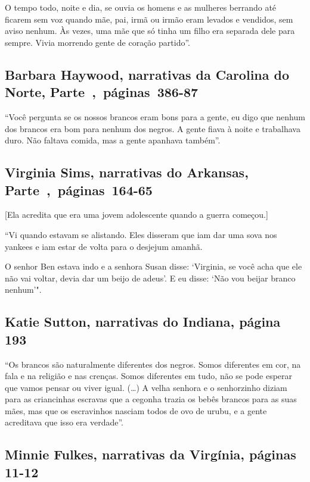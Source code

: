 O tempo todo, noite e dia, se ouvia os homens e as mulheres berrando até
ficarem sem voz quando mãe, pai, irmã ou irmão eram levados e vendidos,
sem aviso nenhum. Às vezes, uma mãe que só tinha um filho era separada
dele para sempre. Vivia morrendo gente de coração partido''.

\subsection{Barbara Haywood, narrativas da Carolina do Norte, Parte~,~páginas~386-87}
\label{ref132}

``Você pergunta se os nossos brancos eram bons para a gente, eu digo que
nenhum dos brancos era bom para nenhum dos negros. A gente fiava à noite
e trabalhava duro. Não faltava comida, mas a gente apanhava também''.

\subsection{Virginia Sims, narrativas do Arkansas, Parte~,~páginas~164-65}
\label{ref241}

{[}Ela acredita que era uma jovem adolescente quando a guerra
começou.{]}

``Vi quando estavam se alistando. Eles disseram que iam dar uma sova nos
yankees e iam estar de volta para o desjejum amanhã.

O senhor Ben estava indo e a senhora Susan disse: `Virginia, se você
acha que ele não vai voltar, devia dar um beijo de adeus'. E eu disse:
`Não vou beijar branco nenhum'".

\subsection{Katie Sutton, narrativas do Indiana, página 193}
\label{ref261}

``Os brancos são naturalmente diferentes dos negros. Somos diferentes em
cor, na fala e na religião e nas crenças. Somos diferentes em tudo, não
se pode esperar que vamos pensar ou viver igual. (\ldots{}) A velha
senhora e o senhorzinho diziam para as criancinhas escravas que a
cegonha trazia os bebês brancos para as suas mães, mas que os
escravinhos nasciam todos de ovo de urubu, e a gente acreditava que isso
era verdade''.

\subsection{Minnie Fulkes, narrativas da Virgínia, páginas 11-12} \label{ref95}


